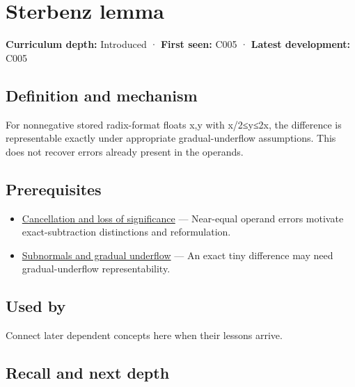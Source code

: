 \hypertarget{appendix-399b7ad53f39}{}\label{referencestart:appendix-399b7ad53f39}
\section{Sterbenz lemma}\label{appendix-399b7ad53f39-sterbenz-lemma}

\textbf{Curriculum depth:} Introduced · \textbf{First seen:} C005 · \textbf{Latest development:} C005

\begin{allmightroledefinition}

\subsection{Definition and mechanism}\label{appendix-399b7ad53f39-definition-and-mechanism}

For nonnegative stored radix-format floats x,y with x/2≤y≤2x, the difference is representable exactly under appropriate gradual-underflow assumptions. This does not recover errors already present in the operands.

\end{allmightroledefinition}

\subsection{Prerequisites}\label{appendix-399b7ad53f39-prerequisites}

\begin{itemize}
\tightlist
\item
  \hyperref[appendix-a2773a6a2f9d]{Cancellation and loss of significance} --- Near-equal operand errors motivate exact-subtraction distinctions and reformulation.
\item
  \hyperref[appendix-00a6e044c437]{Subnormals and gradual underflow} --- An exact tiny difference may need gradual-underflow representability.
\end{itemize}

\subsection{Used by}\label{appendix-399b7ad53f39-used-by}

Connect later dependent concepts here when their lessons arrive.

\subsection{Recall and next depth}\label{appendix-399b7ad53f39-recall-and-next-depth}

